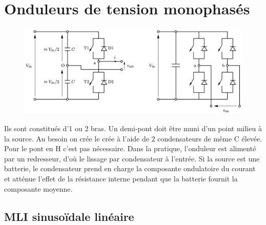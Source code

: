 \section{Onduleurs de tension monophasés}
	\begin{figure}
	\vspace{-5mm}
	\includegraphics[scale=0.28]{ch4/16}
	\end{figure}
	Ils sont constitués d'1 ou 2 bras. Un demi-pont doit être muni d'un point milieu à la source. Au besoin on crée le crée à l'aide de 2 condensateurs de même C élevée.  Pour le pont en H c'est pas nécessaire. Dans la pratique, l'onduleur est alimenté par un redresseur, d'où le lissage par condensateur à l'entrée. Si la source est une batterie, le condensateur prend en charge la composante ondulatoire du courant et atténue l'effet de la résistance interne pendant que la batterie fournit la composante moyenne. 
	
	\subsection{MLI sinusoïdale linéaire}
